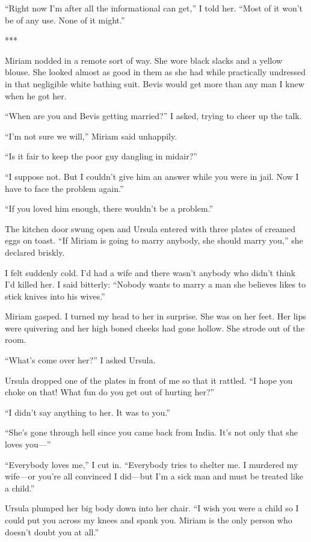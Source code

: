 \documentclass{novel}
\begin{document}
“Right now I’m after all the informational can get,” I told her. “Most of it won’t be of any use. None of it might.”

***

Miriam nodded in a remote sort of way. She wore black slacks and a yellow blouse. She looked almost as good in them as she had while practically undressed in that negligible white bathing suit. Bevis would get more than any man I knew when he got her.

“When are you and Bevis getting married?” I asked, trying to cheer up the talk.

“I’m not sure we will,” Miriam said unhappily.

“Is it fair to keep the poor guy dangling in midair?”

“I suppose not. But I couldn’t give him an answer while you were in jail. Now I have to face the problem again.”

“If you loved him enough, there wouldn’t be a problem.”

The kitchen door swung open and Ursula entered with three plates of creamed eggs on toast. “If Miriam is going to marry anybody, she should marry you,” she declared briskly.

I felt suddenly cold. I’d had a wife and there wasn’t anybody who didn’t think I’d killed her. I said bitterly: “Nobody wants to marry a man she believes likes to stick knives into his wives.”

Miriam gasped. I turned my head to her in surprise. She was on her feet. Her lips were quivering and her high boned cheeks had gone hollow. She strode out of the room.

“What’s come over her?” I asked Ursula.

Ursula dropped one of the plates in front of me so that it rattled. “I hope you choke on that! What fun do you get out of hurting her?”

“I didn’t say anything to her. It was to you.”

“She’s gone through hell since you came back from India. It’s not only that she loves you—”

“Everybody loves me,” I cut in. “Everybody tries to shelter me. I murdered my wife—or you’re all convinced I did—but I’m a sick man and must be treated like a child.”

Ursula plumped her big body down into her chair. “I wish you were a child so I could put you across my knees and spank you. Miriam is the only person who doesn’t doubt you at all.”
\end{document}
